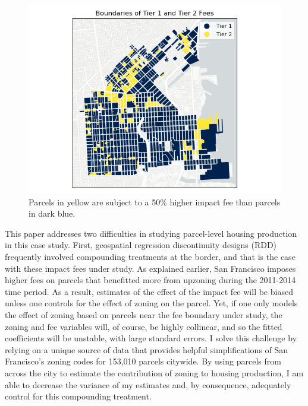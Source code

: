 \documentclass[a4paper,12pt]{article}
\begin{document}
\begin{figure}[hbt]
    \includegraphics[scale=.8]{rdd/tier1_tier2_boundaries.png}
    \caption{Parcels in yellow are subject to a 50\% higher impact fee than parcels in dark blue.}
    \label{fig:tier1_tier2_boundaries}
\end{figure}


This paper addresses two difficulties in studying parcel-level housing production in this case study. First, geospatial regression discontinuity designs (RDD) frequently involved compounding treatments at the border,\cite{keele2015geographic} and that is the case with these impact fees under study. As explained earlier, San Francisco imposes higher fees on parcels that benefitted more from upzoning during the 2011-2014 time period. As a result, estimates of the effect of the impact fee will be biased unless one controls for the effect of zoning on the parcel. Yet, if one only models the effect of zoning based on parcels near the fee boundary under study, the zoning and fee variables will, of course, be highly collinear, and so the fitted coefficients will be unstable, with large standard errors. I solve this challenge by relying on a unique source of data that provides helpful simplifications of San Francisco's zoning codes for 153,010 parcels citywide. By using parcels from across the city to estimate the contribution of zoning to housing production, I am able to decrease the variance of my estimates and, by consequence, adequately control for this compounding treatment.
\end{document}
